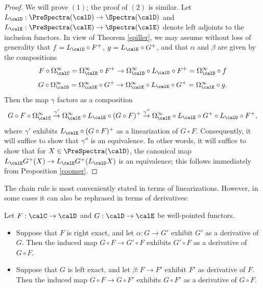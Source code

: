\begin{proof}
We will prove $(1)$; the proof of $(2)$ is similar. Let $L_{\calD}: \PreSpectra(\calD) \rightarrow
\Spectra(\calD)$ and $L_{\calE}: \PreSpectra(\calE) \rightarrow \Spectra(\calE)$ denote left
adjoints to the inclusion functors. In view of Theorem \ref{spiller}, we may assume without loss
of generality that $f = L_{\calD} \circ F^{+}$, $g = L_{\calE} \circ G^{+}$, and that
$\alpha$ and $\beta$ are given by the compositions
$$ F \circ \Omega^{\infty}_{\calC} = \Omega^{\infty}_{\calD} \circ F^{+}
\rightarrow \Omega^{\infty}_{\calD} \circ L_{\calD} \circ F^{+} = \Omega^{\infty}_{\calD} \circ f
$$
$$ G \circ \Omega^{\infty}_{\calD} = \Omega^{\infty}_{\calE} \circ G^{+}
\rightarrow \Omega^{\infty}_{\calE} \circ L_{\calE} \circ G^{+} = \Omega^{\infty}_{\calE} \circ g.$$
Then the map $\gamma$ factors as a composition
$$ G \circ F \circ \Omega^{\infty}_{\calC}
\stackrel{\gamma'}{\rightarrow} \Omega^{\infty}_{\calE} \circ L_{\calE} \circ
(G \circ F)^{+}
\stackrel{\gamma''}{\rightarrow} \Omega^{\infty}_{\calE} \circ L_{\calE} \circ G^{+}
\circ L_{\calD} \circ F^{+},$$
where $\gamma'$ exhibits $L_{\calE} \circ (G \circ F)^{+}$ as a linearization of
$G \circ F$. Consequently, it will suffice to show that $\gamma''$ is an equivalence.
In other words, it will suffice to show that for $X \in \PreSpectra(\calD)$, the canonical map
$L_{\calE} G^{+}(X) \rightarrow L_{\calE} G^{+} (L_{\calD} X)$ is an equivalence; this follows
immediately from Proposition \ref{coomer}.
\end{proof}

The chain rule is most conveniently stated in terms of linearizations. However,
in some cases it can also be rephrased in terms of derivatives:

\begin{proposition}\label{easychain}
Let $F: \calC \rightarrow \calD$ and $G: \calD \rightarrow \calE$ be well-pointed functors.
\begin{itemize}
\item[$(1)$] Suppose that $F$ is right exact, and let $\alpha: G \rightarrow G'$ exhibit
$G'$ as a derivative of $G$. Then the induced map $G \circ F \rightarrow G' \circ F$ exhibits
$G' \circ F$ as a derivative of $G \circ F$.
\item[$(2)$] Suppose that $G$ is left exact, and let $\beta: F \rightarrow F'$ exhibit
$F'$ as derivative of $F$. Then the induced map $G \circ F \rightarrow G \circ F'$ exhibits
$G \circ F'$ as a derivative of $G \circ F$.
\end{itemize}
\end{proposition}


